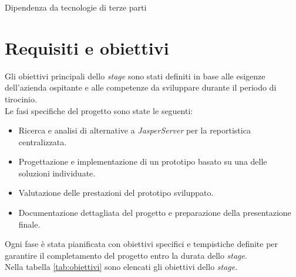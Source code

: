 \begin{risk}{Dipendenza da tecnologie di terze parti}
    \vspace{0.5em}
    \vspace{0.5em}
    \vspace{0.5em}
    \vspace{0.5em}
    \label{risk:dipendenza-terze-parti} 
\end{risk}

\section{Requisiti e obiettivi}
Gli obiettivi principali dello \emph{stage} sono stati definiti in base alle esigenze dell'azienda ospitante e alle competenze da sviluppare durante il periodo di tirocinio.\\
Le fasi specifiche del progetto sono state le seguenti:
\begin{itemize}
    \item Ricerca e analisi di alternative a \emph{JasperServer} per la reportistica centralizzata.
    \item Progettazione e implementazione di un prototipo basato su una delle soluzioni individuate.
    \item Valutazione delle prestazioni del prototipo sviluppato.
    \item Documentazione dettagliata del progetto e preparazione della presentazione finale.
\end{itemize}
Ogni fase è stata pianificata con obiettivi specifici e tempistiche definite per garantire il completamento del progetto entro la durata dello \emph{stage}. \\
Nella tabella \ref{tab:obiettivi} sono elencati gli obiettivi dello \emph{stage}.

